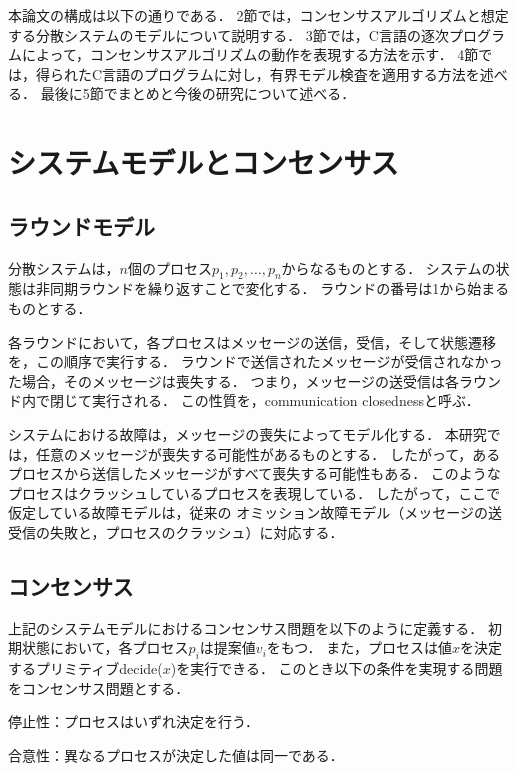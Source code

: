 \documentclass[technicalreport]{ieicej}
\theoremstyle{plain}
\begin{document}
本論文の構成は以下の通りである．
2節では，コンセンサスアルゴリズムと想定する分散システムのモデルについて説明する．
3節では，C言語の逐次プログラムによって，コンセンサスアルゴリズムの動作を表現する方法を示す．
4節では，得られたC言語のプログラムに対し，有界モデル検査を適用する方法を述べる．
最後に5節でまとめと今後の研究について述べる．

\section{システムモデルとコンセンサス}\label{sec:consensus}

\subsection{ラウンドモデル}
分散システムは，$n$個のプロセス$p_1, p_2, \ldots, p_n$からなるものとする．
システムの状態は非同期ラウンドを繰り返すことで変化する．
ラウンドの番号は1から始まるものとする．

各ラウンドにおいて，各プロセスはメッセージの送信，受信，そして状態遷移を，この順序で実行する．
ラウンドで送信されたメッセージが受信されなかった場合，そのメッセージは喪失する．
つまり，メッセージの送受信は各ラウンド内で閉じて実行される．
この性質を，communication closednessと呼ぶ\cite{DamianDMW19}．

システムにおける故障は，メッセージの喪失によってモデル化する．
本研究では，任意のメッセージが喪失する可能性があるものとする．
したがって，あるプロセスから送信したメッセージがすべて喪失する可能性もある．
このようなプロセスはクラッシュしているプロセスを表現している．
したがって，ここで仮定している故障モデルは，従来の
オミッション故障モデル（メッセージの送受信の失敗と，プロセスのクラッシュ）に対応する．

\subsection{コンセンサス}

上記のシステムモデルにおけるコンセンサス問題を以下のように定義する．
初期状態において，各プロセス$p_i$は提案値$v_i$をもつ．
また，プロセスは値$x$を決定するプリミティブdecide($x$)を実行できる．
このとき以下の条件を実現する問題をコンセンサス問題とする．

停止性：プロセスはいずれ決定を行う．

合意性：異なるプロセスが決定した値は同一である．
\end{document}
